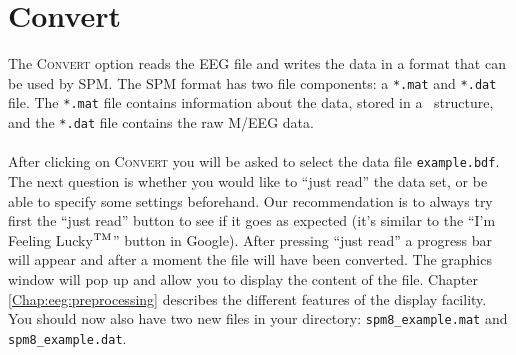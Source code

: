 \section{Convert}
The \textsc{Convert} option reads the EEG file and writes the data in a format that can be used by SPM. The SPM format has two file components: a \texttt{*.mat} and \texttt{*.dat} file. The \texttt{*.mat} file contains information about the data, stored in a \matlab\ structure, and the \texttt{*.dat} file contains the raw M/EEG data.
\\
\\
After clicking on \textsc{Convert} you will be asked to select the data file \texttt{example.bdf}. The next question is whether you would like to ``just read'' the data set, or be able to specify some settings beforehand. Our recommendation is to always try first the ``just read'' button to see if it goes as expected (it's similar to the ``I'm Feeling Lucky\leavevmode\hbox{$\rm {}^{TM}$}'' button in Google). After pressing ``just read'' a progress bar will appear and after a moment the file will have been converted. The graphics window will pop up and allow you to display the content of the file. Chapter \ref{Chap:eeg:preprocessing} describes the different features of the display facility. You should now also have two new files in your directory: \texttt{spm8\_example.mat} and \texttt{spm8\_example.dat}.

